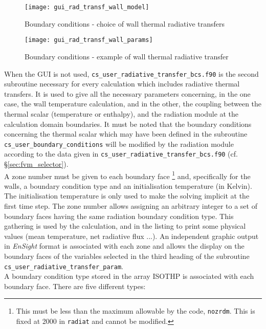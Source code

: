 {{{\begin{figure}[ht]
\begin{center}
\texttt{[image: gui\_rad\_transf\_wall\_model]}
\caption{Boundary conditions - choice of wall thermal radiative transfers}
\label{fig:6_ray}
\end{center}
\end{figure}

\begin{figure}[ht]
\begin{center}
\texttt{[image: gui\_rad\_transf\_wall\_params]}
\caption{Boundary conditions - example of wall thermal radiative transfer}
\label{fig:7_ray}
\end{center}
\end{figure}

When the GUI is not used, \texttt{cs\_user\_radiative\_transfer\_bcs.f90} is the second subroutine necessary for
every calculation which includes radiative thermal transfers. It is used to give all the
necessary parameters concerning, in the one case, the wall temperature
calculation, and in the other, the coupling between the thermal
scalar (temperature or enthalpy), and the radiation module at the
calculation domain boundaries. It must be noted that the boundary conditions
concerning the thermal scalar which may have been defined in the
subroutine \texttt{cs\_user\_boundary\_conditions} will be modified by the radiation module
according to the data given in \texttt{cs\_user\_radiative\_transfer\_bcs.f90} (cf. \S\ref{sec:fvm_selector}).\\
A zone number must be given to each boundary face \footnote{This must be less
 than the maximum allowable by the code, \texttt{nozrdm}. This is fixed at 2000
 in \texttt{radiat} and cannot be modified.} and, specifically for
the walls, a boundary condition type and an initialisation temperature
(in Kelvin). The initialisation temperature is only used to make the
solving implicit at the first time step. The zone number allows assigning
an arbitrary integer to a set of boundary faces having the same
radiation boundary condition type. This gathering is used by the
calculation, and in the listing to print some physical values (mean
temperature, net radiative flux ...). An independent graphic output in
{\em EnSight} format is associated with each zone and allows the display on
the boundary faces of the variables selected in the third heading of the
subroutine \texttt{cs\_user\_radiative\_transfer\_param}.\\
A boundary condition type stored in the array ISOTHP is associated with
each boundary face. There are five different types:

}}}
